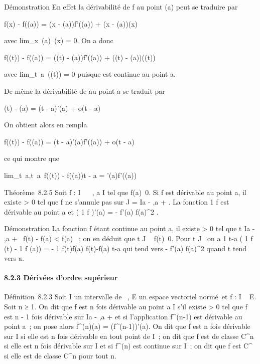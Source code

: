 \documentclass[]{article}
\begin{document}
Démonstration En effet la dérivabilité de f au point \phi(a) peut se
traduire par

f(x) - f(\phi(a)) = (x - \phi(a))f'(\phi(a)) + (x - \phi(a))\epsilon(x)

avec lim_x\rightarrow~\phi(a)~\epsilon(x) = 0. On a donc

f(\phi(t)) - f(\phi(a)) = (\phi(t) - \phi(a))f'(\phi(a)) + (\phi(t) - \phi(a))\epsilon(\phi(t))

avec lim_t\rightarrow~a~\epsilon(\phi(t)) = 0 puisque \phi est
continue au point a.

De même la dérivabilité de \phi au point a se traduit par

\phi(t) - \phi(a) = (t - a)\phi'(a) + o(t - a)

On obtient alors en rempla\ccant

f(\phi(t)) - f(\phi(a)) = (t - a)\phi'(a)f'(\phi(a)) + o(t - a)

ce qui montre que

lim_t\rightarrow~a,t\neq~a~f(\phi(t))
- f(\phi(a))\over t - a = \phi'(a)f'(\phi(a))

Théorème~8.2.5 Soit f : I \rightarrow~ ~, a \in I tel que
f(a)\neq~0. Si f est dérivable au point a, il
existe \epsilon \textgreater{} 0 tel que f ne s'annule pas sur J = I\bigcap{]}a - \epsilon,a
+ \epsilon{[}. La fonction  1 \over f est dérivable au point
a et \left ( 1 \over f
\right )'(a) = - f'(a) \over
f(a)^2 .

Démonstration La fonction f étant continue au point a, il existe \epsilon
\textgreater{} 0 tel que t \in I\bigcap{]}a - \epsilon,a + \epsilon{[}\rigtharrow~f(t) -
f(a) \textless{} f(a)
 ~; on en déduit que t \in J \rigtharrow~
f(t)\neq~0. Pour t \in J
\diagdown\a\ on a  1 \over
t-a \left ( 1 \over f (t) - 1
\over f (a)\right ) = - 1
\over f(t)f(a)  f(t)-f(a) \over t-a
qui tend vers - f'(a) \over f(a)^2 quand t
tend vers a.

\paragraph{8.2.3 Dérivées d'ordre supérieur}

Définition~8.2.3 Soit I un intervalle de ~, E un espace vectoriel
normé~et f : I \rightarrow~ E. Soit n ≥ 1. On dit que f est n fois dérivable au
point a \in I s'il existe \eta \textgreater{} 0 tel que f est n - 1 fois
dérivable sur I\bigcap{]}a - \eta,a + \eta{[} et si l'application f^(n-1)
est dérivable au point a~; on pose alors f^(n)(a) =
(f^(n-1))'(a). On dit que f est n fois dérivable sur I si
elle est n fois dérivable en tout point de I~; on dit que f est de
classe C^n si elle est n fois dérivable sur I et si
f^(n) est continue sur I~; on dit que f est C^\infty~ si
elle est de classe C^n pour tout n.
\end{document}
